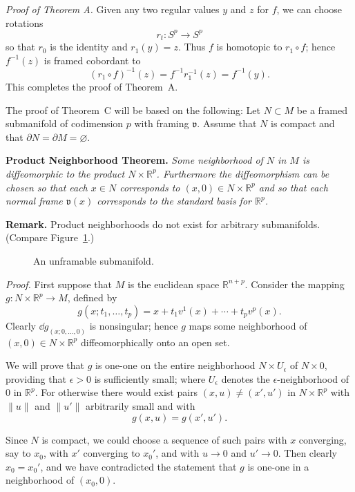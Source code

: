

\noindent\textit{Proof of Theorem A.}
Given any two regular values $y$ and $z$ for $f$, we can choose rotations
\[
r_t : S^p \to S^p
\]
so that $r_0$ is the identity and $r_1(y) = z$. Thus $f$ is homotopic to $r_1 \circ f$; hence $f^{-1}(z)$ is framed cobordant to
\[
(r_1 \circ f)^{-1}(z) = f^{-1} r_1^{-1}(z) = f^{-1}(y).
\]
This completes the proof of Theorem~A.

The proof of Theorem~C will be based on the following: Let $N \subset M$ be a framed submanifold of codimension $p$ with framing $\mathfrak{v}$. Assume that $N$ is compact and that $\partial N = \partial M = \varnothing$.

\noindent\textbf{Product Neighborhood Theorem.} \textit{Some neighborhood of $N$ in $M$ is diffeomorphic to the product $N \times \mathbb{R}^p$. Furthermore the diffeomorphism can be chosen so that each $x \in N$ corresponds to $(x, 0) \in N \times \mathbb{R}^p$ and so that each normal frame $\mathfrak{v}(x)$ corresponds to the standard basis for $\mathbb{R}^p$.}

\noindent\textbf{Remark.} Product neighborhoods do not exist for arbitrary submanifolds. (Compare Figure~\ref{fig:milnor-17}.)

\begin{figure}[htbp]
\centering
\setcounter{figure}{16}%
\caption{An unframable submanifold.}\label{fig:milnor-17}
\end{figure}

\noindent\textit{Proof.}
First suppose that $M$ is the euclidean space $\mathbb{R}^{n+p}$. Consider the mapping $g : N \times \mathbb{R}^p \to M$, defined by
\[
g(x; t_1, \ldots, t_p) = x + t_1 v^1(x) + \cdots + t_p v^p(x).
\]
Clearly $\dd g_{(x; 0, \ldots, 0)}$ is nonsingular; hence $g$ maps some neighborhood of $(x, 0) \in N \times \mathbb{R}^p$ diffeomorphically onto an open set.

We will prove that $g$ is one-one on the entire neighborhood $N \times U_\epsilon$ of $N \times 0$, providing that $\epsilon > 0$ is sufficiently small; where $U_\epsilon$ denotes the $\epsilon$-neighborhood of $0$ in $\mathbb{R}^p$. For otherwise there would exist pairs $(x, u) \neq (x', u')$ in $N \times \mathbb{R}^p$ with $\|u\|$ and $\|u'\|$ arbitrarily small and with
\[
g(x, u) = g(x', u').
\]



Since $N$ is compact, we could choose a sequence of such pairs with $x$ converging, say to $x_0$, with $x'$ converging to $x_0'$, and with $u \to 0$ and $u' \to 0$. Then clearly $x_0 = x_0'$, and we have contradicted the statement that $g$ is one-one in a neighborhood of $(x_0, 0)$.

